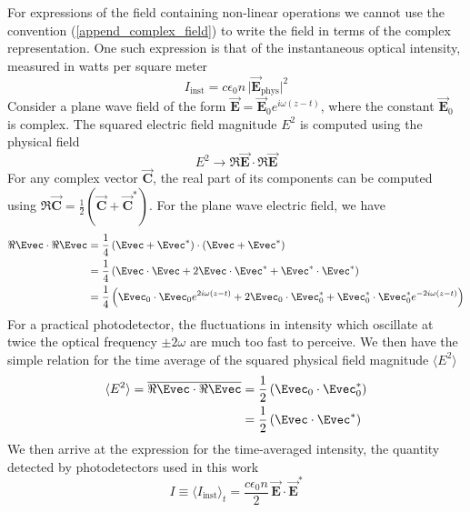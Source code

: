 For expressions of the field containing non-linear operations we cannot use the convention (\ref{append_complex_field}) to write the field in terms of the complex representation. One such expression is that of the instantaneous optical intensity, measured in watts per square meter
\begin{equation}
	I_\mathrm{inst} = c\epsilon_0 n\,\big| \vec{\mathbf{E}}_\mathrm{phys} \big|^2
\end{equation}
Consider a plane wave field of the form $\vec{\mathbf{E}} = \vec{\mathbf{E}}_0 e^{i\omega (z-t)}$, where the constant $\vec{\mathbf{E}}_0$ is complex. The squared electric field magnitude $E^2$ is computed using the physical field
\begin{equation}
	E^2 \rightarrow \Re \vec{\mathbf{E}} \cdot \Re \vec{\mathbf{E}}
\end{equation}
For any complex vector $\vec{\mathbf{C}}$, the real part of its components can be computed using $\Re \vec{\mathbf{C}} = \frac{1}{2}\left(\vec{\mathbf{C}} + \vec{\mathbf{C}}^*\right)$. For the plane wave electric field, we have
\begin{align}
	\Re \Evec \cdot \Re \Evec &= \frac{1}{4}\left(\Evec + \Evec^*\right)\cdot\left(\Evec + \Evec^*\right) \nonumber \\
	&= \frac{1}{4}\left(\Evec\cdot\Evec + 2\Evec\cdot\Evec^* + \Evec^*\cdot\Evec^*\right) \nonumber \\
	&= \frac{1}{4}\left(\Evec_0\cdot\Evec_0e^{2i\omega(z-t)} + 2\Evec_0\cdot\Evec_0^* + \Evec_0^*\cdot\Evec_0^*e^{-2i\omega(z-t)}\right)
\end{align}
For a practical photodetector, the fluctuations in intensity which oscillate at twice the optical frequency $\pm2\omega$ are much too fast to perceive. We then have the simple relation for the time average of the squared physical field magnitude $\langle E^2 \rangle$
\begin{align}
	\langle E^2 \rangle = \overline{\Re \Evec \cdot \Re \Evec} &= \frac{1}{2} \left(\Evec_0\cdot\Evec_0^*\right) \nonumber \\
	&= \frac{1}{2} \left(\Evec\cdot\Evec^*\right)
\end{align}
We then arrive at the expression for the time-averaged intensity, the quantity detected by photodetectors used in this work
\begin{equation}
	I \equiv \langle I_\mathrm{inst} \rangle_t = \frac{c\epsilon_0 n}{2} \, \vec{\mathbf{E}} \cdot \vec{\mathbf{E}}^*
\end{equation}


